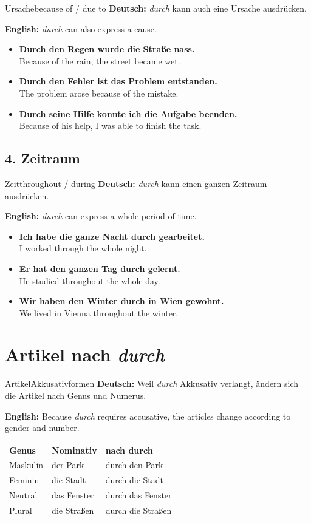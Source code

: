 \documentclass[a4paper,11pt]{article}
\newcommand{\GermanText}[1]{\textbf{Deutsch: }#1\par}
\newcommand{\EnglishText}[1]{{\small\color{SoftGray}\textbf{English: }#1\par}}
\newcommand{\ExampleItem}[2]{\item \textbf{#1}\\{\small\color{SoftGray}#2}}
\begin{document}
\begin{grammarentry}{Ursache}{because of / due to}
\GermanText{\textit{durch} kann auch eine Ursache ausdrücken.}
\EnglishText{\textit{durch} can also express a cause.}

\begin{exbox}
\begin{itemize}
    \ExampleItem{Durch den Regen wurde die Straße nass.}{Because of the rain, the street became wet.}
    \ExampleItem{Durch den Fehler ist das Problem entstanden.}{The problem arose because of the mistake.}
    \ExampleItem{Durch seine Hilfe konnte ich die Aufgabe beenden.}{Because of his help, I was able to finish the task.}
\end{itemize}
\end{exbox}
\end{grammarentry}

\subsection{4. Zeitraum}

\begin{grammarentry}{Zeit}{throughout / during}
\GermanText{\textit{durch} kann einen ganzen Zeitraum ausdrücken.}
\EnglishText{\textit{durch} can express a whole period of time.}

\begin{exbox}
\begin{itemize}
    \ExampleItem{Ich habe die ganze Nacht durch gearbeitet.}{I worked through the whole night.}
    \ExampleItem{Er hat den ganzen Tag durch gelernt.}{He studied throughout the whole day.}
    \ExampleItem{Wir haben den Winter durch in Wien gewohnt.}{We lived in Vienna throughout the winter.}
\end{itemize}
\end{exbox}
\end{grammarentry}

\section{Artikel nach \textit{durch}}

\begin{grammarentry}{Artikel}{Akkusativformen}
\GermanText{Weil \textit{durch} Akkusativ verlangt, ändern sich die Artikel nach Genus und Numerus.}
\EnglishText{Because \textit{durch} requires accusative, the articles change according to gender and number.}

\begin{center}
\begin{tabular}{lll}
\textbf{Genus} & \textbf{Nominativ} & \textbf{nach durch} \\
Maskulin & der Park & durch den Park \\
Feminin & die Stadt & durch die Stadt \\
Neutral & das Fenster & durch das Fenster \\
Plural & die Straßen & durch die Straßen \\
\end{tabular}
\end{center}
\end{grammarentry}
\end{document}
